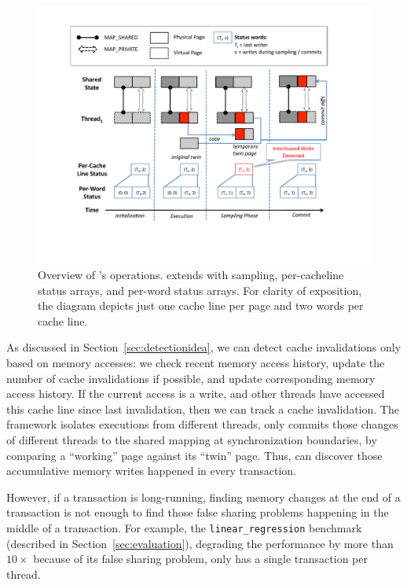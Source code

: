 \begin{figure}[!t]
\centering
\includegraphics[width=6in]{sheriff/figure/sheriffdetective.pdf}
\caption{
Overview of \SheriffDetect{}’s operations. \SheriffDetect{} extends \Sheriff{} with sampling, per-cacheline status arrays, and per-word status arrays. For clarity of exposition, the diagram depicts just one cache line per page and two words per cache line.\label{fig:sheriffdetect}}
\end{figure}

As discussed in Section~\ref{sec:detectionidea}, we can detect cache invalidations only based on memory accesses: we check recent memory access history, update the number of cache invalidations if possible, and update corresponding memory access history. 
If the current access is a write, and other threads have accessed this cache line since last invalidation, then we can track a cache invalidation. 
The \sheriff{} framework isolates executions from different threads, only commits those changes of different threads to the shared mapping at synchronization boundaries, by comparing a ``working'' page against its ``twin'' page. Thus, \sheriffDetect{} can discover those accumulative memory writes 
happened in every transaction.  

However, if a transaction is long-running, finding memory changes at the end of a transaction is not enough 
to find those false sharing problems happening in the middle of a transaction. For example, the \texttt{linear\_regression} benchmark (described in Section~\ref{sec:evaluation}), 
degrading the performance by more than $10\times$ because of its false sharing problem, only has a single transaction per thread. 

